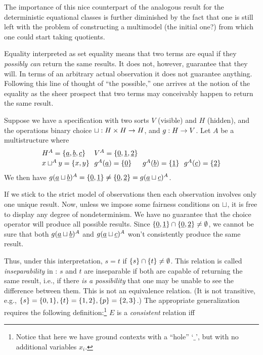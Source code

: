 {The importance of this nice counterpart of the analogous result for 
the deterministic equational classes is further diminished by the 
fact that one is still left with the problem of constructing a 
multimodel (the initial one?) from which one could start taking quotients. 
 
Equality interpreted as set 
equality means that two terms are equal if they {\em possibly 
can} return the same 
results. It does not, however, guarantee that they will. In terms of 
an arbitrary actual observation it does not guarantee anything. 
Following this line of thought of ``the possible,''
 one arrives at the notion of the equality as the sheer prospect that 
two terms may conceivably happen to return the same result.

\begin{Example}  
Suppose we have a 
specification with two sorts $V$ (visible) and $H$ (hidden), and the 
operations binary choice $\sqcup: H\times H\mathrel{\rightarrow} H$, and $g:H\mathrel{\rightarrow} V$. 
Let $A$ be a multistructure where 
\[\begin{array}{l@{\ \ }l@{\ \ }l@{\ \ }l}
H^{A}=\{\und a, \und b, \und c\} & V^{A}=\{\und 0, \und 1, \und 2\} \\[.5ex]
x\ch^{A}y=\{x,y\} & g^{A}(\und a) = \{\und 0\} & g^{A}(\und b) = \{\und 1\}
   & g^{A}(\und c) = \{\und 2\}
   \end{array}
\]
We then have $g(\underline{a}\sqcup\underline{b})^{A} = \{\underline{0},\underline{1}\} \not= \{\underline{0},\underline{2}\} = g(\underline{a}\sqcup\underline{c})^{A}$.

If we stick to the strict model of observations then each observation 
involves only one unique result. Now, unless we impose some fairness 
conditions on $\sqcup$, it is free to display any degree of nondeterminism. 
We have no guarantee that the choice operator will produce all possible 
results. Since $\{\underline{0},\underline{1}\}\cap\{\underline{0},\underline{2}\}\not=\emptyset$, 
we cannot be sure that both $g(\underline{a}\sqcup\underline{b})^{A}$ and $g(\underline{a}\sqcup\underline{c})^{A}$  
won't consistently produce the same result.
\end{Example}
Thus, under this interpretation, $s=t$ if $\{s\} \cap \{t\} \not=\emptyset$. 
This relation is 
called {\em inseparability} in \cite{c:53}: $s$ and $t$
 are inseparable if both are capable of returning the same result, 
i.e., if there {\em is a possibility} that one may be unable to see 
the difference between them. This is not an equivalence relation. (It 
is not transitive, e.g., $\{s\}=\{0,1\}, \{t\}=\{1,2\}, \{p\} 
=\{2,3\}$.) The appropriate 
generalization requires the following definition:\footnote{Notice that here we have
ground contexts with a ``hole'' `$\_$', but with no additional variables $x_i$.}
$E$ is a {\em consistent} relation iff
\label{eq:cons} 

}
